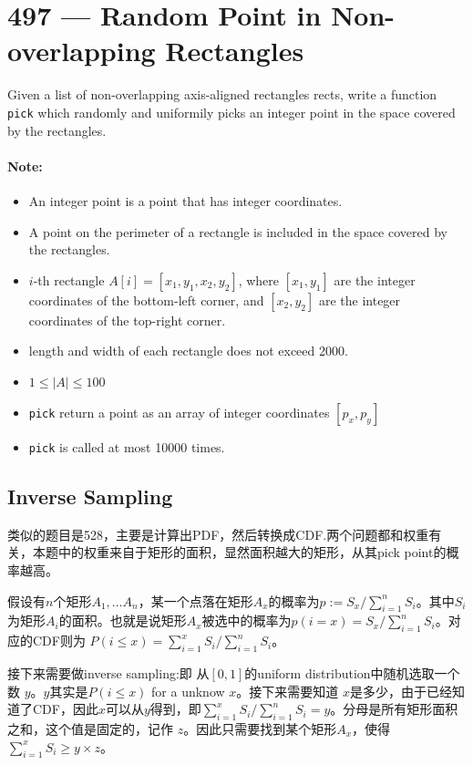 \section{497 --- Random Point in Non-overlapping Rectangles}
Given a list of non-overlapping axis-aligned rectangles rects, write a function \texttt{pick} which randomly and uniformily picks an integer point in the space covered by the rectangles.

\paragraph{Note:}

\begin{itemize}
\item An integer point is a point that has integer coordinates. 
\item A point on the perimeter of a rectangle is included in the space covered by the rectangles. 
\item $i$-th rectangle $A[i] = [x_1,y_1,x_2,y_2]$, where $[x_1, y_1]$ are the integer coordinates of the bottom-left corner, and $[x_2, y_2]$ are the integer coordinates of the top-right corner.
\item length and width of each rectangle does not exceed 2000.
\item $1 \leq \lvert A\rvert \leq 100$
\item \texttt{pick} return a point as an array of integer coordinates $[p_x, p_y]$
\item \texttt{pick} is called at most 10000 times.
\end{itemize}

\subsection{Inverse Sampling}
类似的题目是528，主要是计算出PDF，然后转换成CDF.两个问题都和权重有关，本题中的权重来自于矩形的面积，显然面积越大的矩形，从其pick point的概率越高。

假设有$n$个矩形$A_1, \ldots A_n$，某一个点落在矩形$A_x$的概率为$p:=S_x/\sum\limits_{i=1}^{n}S_i$。其中$S_i$为矩形$A_i$的面积。也就是说矩形$A_x$被选中的概率为$p(i=x) = S_x/\sum\limits_{i=1}^{n}S_i$。对应的CDF则为 $P(i\leq x) = \sum\limits_{i=1}^{x}S_i / \sum\limits_{i=1}^{n}S_i$。

接下来需要做inverse sampling:即 从$[0,1]$的uniform distribution中随机选取一个数 $y$。$y$其实是$P(i\leq x)$ for a unknow $x$。接下来需要知道 $x$是多少，由于已经知道了CDF，因此$x$可以从$y$得到，即$\sum\limits_{i=1}^{x}S_i / \sum\limits_{i=1}^{n}S_i = y$。分母是所有矩形面积之和，这个值是固定的，记作 $z$。因此只需要找到某个矩形$A_x$，使得$\sum\limits_{i=1}^{x}S_i \geq y\times z$。


